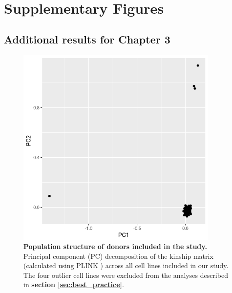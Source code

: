 
\chapter{Supplementary Figures}

\section{Additional results for Chapter 3}

\begin{figure}[h]
    \centering
    \includegraphics[width=10cm]{Appendix2/Fig/supplement_genotype_pcs.png}
    \caption[Population structure of donors included in the study]{\textbf{Population structure of donors included in the study.} \\
    Principal component (PC) decomposition of the kinship matrix (calculated using PLINK \cite{purcell2007plink}) across all cell lines included in our study.
    The four outlier cell lines were excluded from the analyses described in \textbf{section \ref{sec:best_practice}}.}
    \label{suppl_fig:kinship_pcs}
\end{figure}

